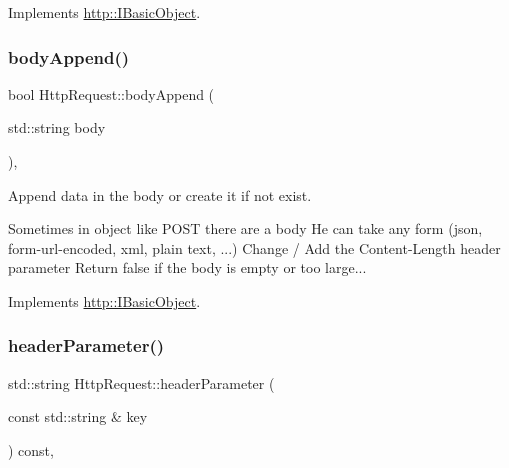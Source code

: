 Implements \hyperlink{structhttp_1_1IBasicObject_aa304f3a3137912f1dbff798531fa4c09}{http\+::\+I\+Basic\+Object}.

\mbox{\label{classHttpRequest_afd8f9f22651d2844b7b2d4cb882b7e19}} 
\subsubsection{\texorpdfstring{body\+Append()}{bodyAppend()}}
{\footnotesize\ttfamily bool Http\+Request\+::body\+Append (\begin{DoxyParamCaption}\item[{std\+::string}]{body }\end{DoxyParamCaption})\hspace{0.3cm}{\ttfamily [virtual]}, {\ttfamily [noexcept]}}



Append data in the body or create it if not exist. 

Sometimes in object like P\+O\+ST there are a body He can take any form (json, form-\/url-\/encoded, xml, plain text, ...) Change / Add the \textquotesingle{}Content-\/\+Length\textquotesingle{} header parameter Return false if the body is empty or too large... 

Implements \hyperlink{structhttp_1_1IBasicObject_abf2cb4a0e7908313b827ad4635bad730}{http\+::\+I\+Basic\+Object}.

\mbox{\label{classHttpRequest_a96f232879fff933182a3ed5c80229df6}} 
\subsubsection{\texorpdfstring{header\+Parameter()}{headerParameter()}\hspace{0.1cm}{\footnotesize\ttfamily [1/2]}}
{\footnotesize\ttfamily std\+::string Http\+Request\+::header\+Parameter (\begin{DoxyParamCaption}\item[{const std\+::string \&}]{key }\end{DoxyParamCaption}) const\hspace{0.3cm}{\ttfamily [virtual]}, {\ttfamily [noexcept]}}



